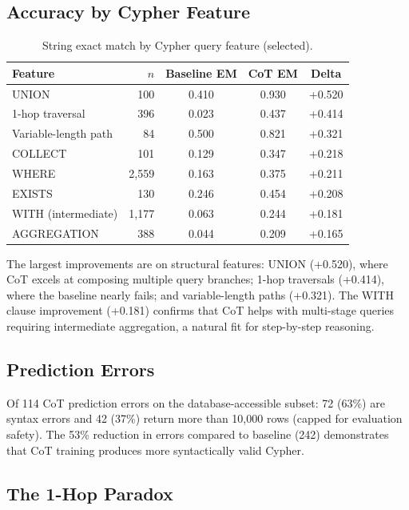 \documentclass[11pt]{article}
\begin{document}
\subsection{Accuracy by Cypher Feature}

\begin{table}[h]
\centering
\caption{String exact match by Cypher query feature (selected).}
\label{tab:features}
\begin{tabular}{lrccc}
\toprule
\textbf{Feature} & \textbf{$n$} & \textbf{Baseline EM} & \textbf{CoT EM} & \textbf{Delta} \\
\midrule
UNION & 100 & 0.410 & 0.930 & +0.520 \\
1-hop traversal & 396 & 0.023 & 0.437 & +0.414 \\
Variable-length path & 84 & 0.500 & 0.821 & +0.321 \\
COLLECT & 101 & 0.129 & 0.347 & +0.218 \\
WHERE & 2,559 & 0.163 & 0.375 & +0.211 \\
EXISTS & 130 & 0.246 & 0.454 & +0.208 \\
WITH (intermediate) & 1,177 & 0.063 & 0.244 & +0.181 \\
AGGREGATION & 388 & 0.044 & 0.209 & +0.165 \\
\bottomrule
\end{tabular}
\end{table}

The largest improvements are on structural features: UNION (+0.520), where CoT excels at composing multiple query branches; 1-hop traversals (+0.414), where the baseline nearly fails; and variable-length paths (+0.321). The WITH clause improvement (+0.181) confirms that CoT helps with multi-stage queries requiring intermediate aggregation, a natural fit for step-by-step reasoning.

\subsection{Prediction Errors}

Of 114 CoT prediction errors on the database-accessible subset: 72 (63\%) are syntax errors and 42 (37\%) return more than 10,000 rows (capped for evaluation safety). The 53\% reduction in errors compared to baseline (242) demonstrates that CoT training produces more syntactically valid Cypher.

\subsection{The 1-Hop Paradox}
\end{document}
